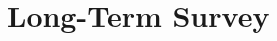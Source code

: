 \documentclass[../main.tex]{subfiles}
\begin{document}
  \section{Long-Term Survey}
      \label{ase:long-term-survey}
\end{document}
